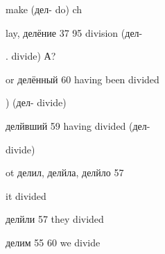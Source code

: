 \begin{minipage}[t]{0.475\textwidth}
\noindent make (дел- do) ch\par
\noindent lay, делёние 37 95 division (дел-\par
{}. divide) А?\par
\noindent or делённый 60 having been divided\par
\noindent ) (дел- divide)\par
\noindent делйвший 59 having divided (дел-\par
\noindent divide)\par
\noindent ot делил, делйла, делйло 57\par
\noindent it divided\par
\noindent делйли 57 they divided\par
\noindent делим 55 60 we divide\par
\end{minipage}
\endgroup

